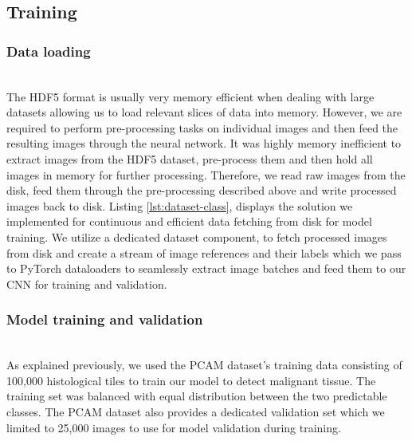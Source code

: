 \documentclass{l4proj}
\begin{document}
\subsection{Training} \label{training-implementation}
\subsubsection{Data loading}\hfill\\
The HDF5 format is usually very memory efficient when dealing with large datasets allowing us to load relevant slices of data into memory. However, we are required to perform pre-processing tasks on individual images and then feed the resulting images through the neural network. It was highly memory inefficient to extract images from the HDF5 dataset, pre-process them and then hold all images in memory for further processing. Therefore, we read raw images from the disk, feed them through the pre-processing described above and write processed images back to disk. Listing \ref{lst:dataset-class}, displays the solution we implemented for continuous and efficient data fetching from disk for model training. We utilize a dedicated dataset component, to fetch processed images from disk and create a stream of image references and their labels which we pass to PyTorch dataloaders to seamlessly extract image batches and feed them to our CNN for training and validation. 



\subsubsection{Model training and validation}\hfill\\
As explained previously, we used the PCAM dataset's training data consisting of 100,000 histological tiles to train our model to detect malignant tissue. The training set was balanced with equal distribution between the two predictable classes. The PCAM dataset also provides a dedicated validation set which we limited to 25,000 images to use for model validation during training. 
\end{document}
